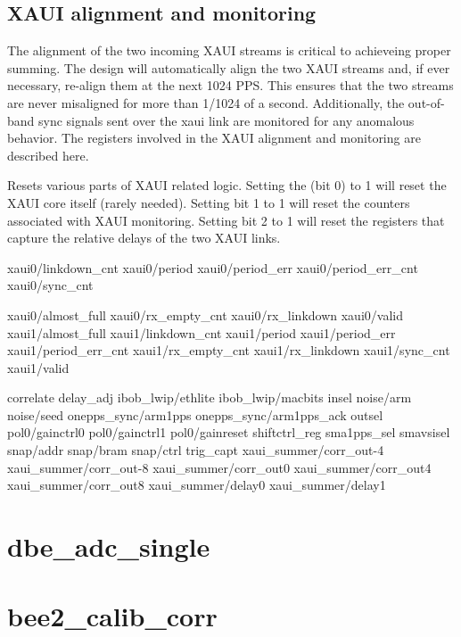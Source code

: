 \documentclass[12pt]{article}
\begin{document}
\subsection{XAUI alignment and monitoring}

The alignment of the two incoming XAUI streams is critical to achieveing proper
summing.  The design will automatically align the two XAUI streams and, if ever
necessary, re-align them at the next 1024 PPS.  This ensures that the two
streams are never misaligned for more than 1/1024 of a second.  Additionally,
the out-of-band sync signals sent over the xaui link are monitored for any
anomalous behavior.  The registers involved in the XAUI alignment and
monitoring are described here.

\begin{description}
  Resets various parts of XAUI related logic.  Setting the
\LSb (bit 0) to 1 will reset the XAUI core itself (rarely needed).  Setting bit
1 to 1 will reset the counters associated with XAUI monitoring.  Setting bit 2
to 1 will reset the registers that capture the relative delays of the two XAUI
links.
\end{description}

xaui0/linkdown\_cnt
xaui0/period
xaui0/period\_err
xaui0/period\_err\_cnt
xaui0/sync\_cnt

xaui0/almost\_full
xaui0/rx\_empty\_cnt
xaui0/rx\_linkdown
xaui0/valid
xaui1/almost\_full
xaui1/linkdown\_cnt
xaui1/period
xaui1/period\_err
xaui1/period\_err\_cnt
xaui1/rx\_empty\_cnt
xaui1/rx\_linkdown
xaui1/sync\_cnt
xaui1/valid

correlate
delay\_adj
ibob\_lwip/ethlite
ibob\_lwip/macbits
insel
noise/arm
noise/seed
onepps\_sync/arm1pps
onepps\_sync/arm1pps\_ack
outsel
pol0/gainctrl0
pol0/gainctrl1
pol0/gainreset
shiftctrl\_reg
sma1pps\_sel
smavsisel
snap/addr
snap/bram
snap/ctrl
trig\_capt
xaui\_summer/corr\_out-4
xaui\_summer/corr\_out-8
xaui\_summer/corr\_out0
xaui\_summer/corr\_out4
xaui\_summer/corr\_out8
xaui\_summer/delay0
xaui\_summer/delay1


\section{dbe\_adc\_single}

\section{bee2\_calib\_corr}
\end{document}
